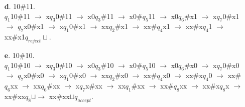 \documentclass[12pt]{letter}
\begin{document}
\begin{enumerate}
\begin{enumerate}
	\item[\textbf{d}.] 10\#11. \\
	$q_1$10\#11 $\rightarrow$ x$q_3$0\#11 $\rightarrow$ x0$q_3$\#11 $\rightarrow$ x0\#$q_5$11 $\rightarrow$ x0$q_6$\#x1 $\rightarrow$ x$q_7$0\#x1 $\rightarrow$ $q_7$x0\#x1 $\rightarrow$ x$q_1$0\#x1 $\rightarrow$ xx$q_2$\#x1 $\rightarrow$ xx\#$q_4$x1 $\rightarrow$ xx\#x$q_4$1 $\rightarrow$ xx\#x1$q_{reject} \sqcup.$

	\newpage

	\item[\textbf{e}.] 10\#10. \\
$q_1$10\#10 $\rightarrow$ x$q_3$0\#10 $\rightarrow$ x0$q_3$\#10 $\rightarrow$ x0\#$q_5$10 $\rightarrow$ x0$q_6$\#x0 $\rightarrow$ x$q_7$0\#x0 $\rightarrow$ $q_7$x0\#x0 $\rightarrow$ x$q_1$0\#x0 $\rightarrow$ xx$q_2$\#x0 $\rightarrow$ xx\#$q_4$x0 $\rightarrow$ xx\#x$q_4$0 $\rightarrow$ xx\#$q_6$xx $\rightarrow$ xx$q_6$\#xx $\rightarrow$ x$q_7$x\#xx $\rightarrow$ xx$q_1$\#xx $\rightarrow$ xx\#$q_8$xx $\rightarrow$ xx\#x$q_8$x $\rightarrow$ xx\#xx$q_8\sqcup \rightarrow$ xx\#xx$\sqcup q_{accept}.$


\end{enumerate}
\end{enumerate}
\end{document}
